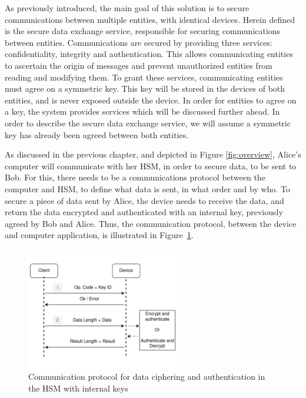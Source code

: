 As previously introduced, the main goal of this solution is to secure communications between multiple entities, with identical devices.
Herein defined is the secure data exchange service, responsible for securing communications between entities. 
Communications are secured by providing three services: confidentiality, integrity and authentication. This allows communicating entities to ascertain the origin of messages and prevent unauthorized entities from reading and modifying them.
To grant these services, communicating entities must agree on a symmetric key. This key will be stored in the devices of both entities, and is never exposed outside the device. In order for entities to agree on a key, the system provides services which will be discussed further ahead. In order to describe the secure data exchange service, we will assume a symmetric key has already been agreed between both entities.

As discussed in the previous chapter, and depicted in Figure \ref{fig:overview}, Alice's computer will communicate with her HSM, in order to secure data, to be sent to Bob. For this, there needs to be a communications protocol between the computer and HSM, to define what data is sent, in what order and by who. To secure a piece of data sent by Alice, the device needs to receive the data, and return the data encrypted and authenticated with an internal key, previously agreed by Bob and Alice.
Thus, the communication protocol, between the device and computer application, is illustrated in Figure~\ref{fig:protocol:data-exchange}.

\begin{figure}[h!]
	\centering
	\includegraphics[width=0.60\textwidth]{./Images/data-exchange.png}
	\caption{Communication protocol for data ciphering and authentication in the HSM with internal keys}
	\label{fig:protocol:data-exchange}
\end{figure}

